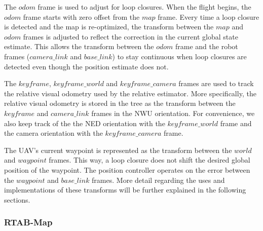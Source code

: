 \documentclass[letterpaper, 10 pt, conference]{ieeeconf}  %
\begin{document}
The $\mathit{odom}$ frame is used to adjust for loop closures. When the flight begins, the $\mathit{odom}$ frame starts with zero offset from the $\mathit{map}$ frame. Every time a loop closure is detected and the map is re-optimized, the transform between the $\mathit{map}$ and $\mathit{odom}$ frames is adjusted to reflect the correction in the current global state estimate. This allows the transform between the $\mathit{odom}$ frame and the robot frames ($\mathit{camera\_link}$ and $\mathit{base\_link}$) to stay continuous when loop closures are detected even though the position estimate does not.

The $\mathit{keyframe}$, $\mathit{keyframe\_world}$ and $\mathit{keyframe\_camera}$ frames are used to track the relative visual odometry used by the relative estimator. More specifically, the relative visual odometry is stored in the tree as the transform between the $\mathit{keyframe}$ and $\mathit{camera\_link}$ frames in the NWU orientation. For convenience, we also keep track of the the NED orientation with the $\mathit{keyframe\_world}$ frame and the camera orientation with the $\mathit{keyframe\_camera}$ frame.

The UAV's current waypoint is represented as the transform between the $\mathit{world}$ and $\mathit{waypoint}$ frames. This way, a loop closure does not shift the desired global position of the waypoint. The position controller operates on the error between the $\mathit{waypoint}$ and $\mathit{base\_link}$ frames. More detail regarding the uses and implementations of these transforms will be further explained in the following sections.


\subsubsection{RTAB-Map}
\end{document}
